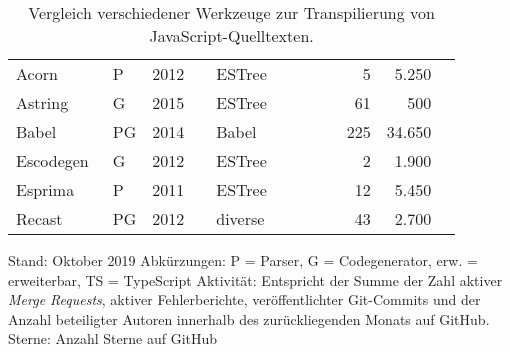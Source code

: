 \begin{table}[tbh]
  \footnotesize
  \begin{tabu} to 
    \midrule
     &  &  &  &  &  &  &  &  &  &  \\
    \midrule
    Acorn~\autocite{ACORN}         & P    & 2012 &  & ESTree  &  &  &  &  &   5 &  5.250 & {} \\
    Astring~\autocite{ASTRING}     & G    & 2015 &  & ESTree  &  &  &  &  &  61 &    500 & {} \\
    Babel~\autocite{BABEL}         & PG   & 2014 &  & Babel   &  &  &  &  & 225 & 34.650 & {} \\
    Escodegen~\autocite{ESCODEGEN} & G    & 2012 &  & ESTree  &  &  &  &  &   2 &  1.900 & {} \\
    Esprima~\autocite{ESPRIMA}     & P    & 2011 &  & ESTree  &  &  &  &  &  12 &  5.450 & {} \\
    Recast~\autocite{RECAST}       & PG   & 2012 &  & diverse &  &  &  &  &  43 &  2.700 & {} \\
    \midrule
  \end{tabu}
  \caption*{
    \footnotesize
    Stand: Oktober 2019
    \medbreak
    Abkürzungen: P = Parser, G = Codegenerator, erw. = erweiterbar, TS = TypeScript
    \medbreak
    Aktivität: Entspricht der Summe der Zahl aktiver \emph{Merge Requests}, aktiver Fehlerberichte, veröffentlichter Git-Commits und der Anzahl beteiligter Autoren innerhalb des zurückliegenden Monats auf GitHub.
    \medbreak
    Sterne: Anzahl Sterne auf GitHub
  }
  \caption{Vergleich verschiedener Werkzeuge zur Transpilierung von JavaScript-Quelltexten.}
  \label{tab:transpilers}
\end{table}
